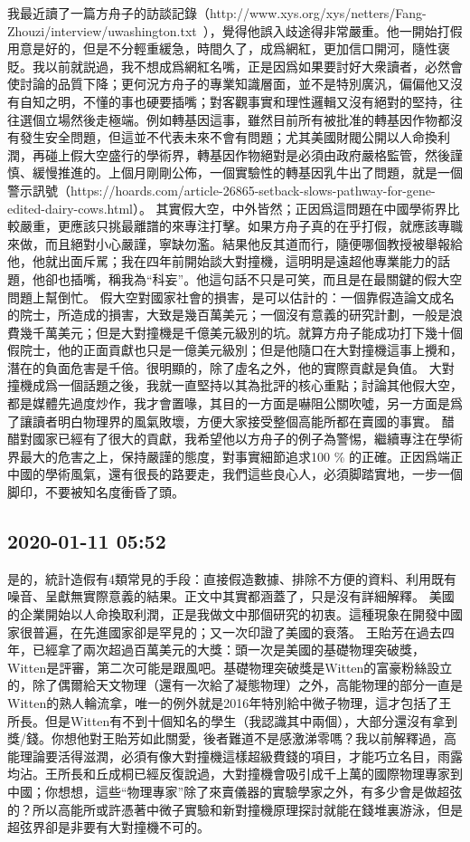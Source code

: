 \documentclass[twocolumn]{ctexart}
\begin{document}
我最近讀了一篇方舟子的訪談記錄（http://www.xys.org/xys/netters/Fang-Zhouzi/interview/uwashington.txt ），覺得他誤入歧途得非常嚴重。他一開始打假用意是好的，但是不分輕重緩急，時間久了，成爲網紅，更加信口開河，隨性褒貶。我以前就説過，我不想成爲網紅名嘴，正是因爲如果要討好大衆讀者，必然會使討論的品質下降；更何況方舟子的專業知識層面，並不是特別廣汎，偏偏他又沒有自知之明，不懂的事也硬要插嘴；對客觀事實和理性邏輯又沒有絕對的堅持，往往選個立場然後走極端。例如轉基因這事，雖然目前所有被批准的轉基因作物都沒有發生安全問題，但這並不代表未來不會有問題；尤其美國財閥公開以人命換利潤，再碰上假大空盛行的學術界，轉基因作物絕對是必須由政府嚴格監管，然後謹慎、緩慢推進的。上個月剛剛公佈，一個實驗性的轉基因乳牛出了問題，就是一個警示訊號（https://hoards.com/article-26865-setback-slows-pathway-for-gene-edited-dairy-cows.html）。
其實假大空，中外皆然；正因爲這問題在中國學術界比較嚴重，更應該只挑最離譜的來專注打擊。如果方舟子真的在乎打假，就應該專職來做，而且絕對小心嚴謹，寧缺勿濫。結果他反其道而行，隨便哪個教授被舉報給他，他就出面斥駡；我在四年前開始談大對撞機，這明明是遠超他專業能力的話題，他卻也插嘴，稱我為“科妄”。他這句話不只是可笑，而且是在最關鍵的假大空問題上幫倒忙。
假大空對國家社會的損害，是可以估計的：一個靠假造論文成名的院士，所造成的損害，大致是幾百萬美元；一個沒有意義的研究計劃，一般是浪費幾千萬美元；但是大對撞機是千億美元級別的坑。就算方舟子能成功打下幾十個假院士，他的正面貢獻也只是一億美元級別；但是他隨口在大對撞機這事上攪和，潛在的負面危害是千倍。很明顯的，除了虛名之外，他的實際貢獻是負值。
大對撞機成爲一個話題之後，我就一直堅持以其為批評的核心重點；討論其他假大空，都是媒體先過度炒作，我才會置喙，其目的一方面是嚇阻公關吹噓，另一方面是爲了讓讀者明白物理界的風氣敗壞，方便大家接受整個高能所都在賣國的事實。
醋醋對國家已經有了很大的貢獻，我希望他以方舟子的例子為警惕，繼續專注在學術界最大的危害之上，保持嚴謹的態度，對事實細節追求100 \% 的正確。正因爲端正中國的學術風氣，還有很長的路要走，我們這些良心人，必須脚踏實地，一步一個脚印，不要被知名度衝昏了頭。
\subsection*{2020-01-11 05:52}

是的，統計造假有4類常見的手段：直接假造數據、排除不方便的資料、利用既有噪音、呈獻無實際意義的結果。正文中其實都涵蓋了，只是沒有詳細解釋。 
美國的企業開始以人命換取利潤，正是我做文中那個研究的初衷。這種現象在開發中國家很普遍，在先進國家卻是罕見的；又一次印證了美國的衰落。 
王貽芳在過去四年，已經拿了兩次超過百萬美元的大獎：頭一次是美國的基礎物理突破獎，Witten是評審，第二次可能是跟風吧。基礎物理突破獎是Witten的富豪粉絲設立的，除了偶爾給天文物理（還有一次給了凝態物理）之外，高能物理的部分一直是Witten的熟人輪流拿，唯一的例外就是2016年特別給中微子物理，這才包括了王所長。但是Witten有不到十個知名的學生（我認識其中兩個），大部分還沒有拿到獎/錢。你想他對王貽芳如此關愛，後者難道不是感激涕零嗎？我以前解釋過，高能理論要活得滋潤，必須有像大對撞機這樣超級費錢的項目，才能巧立名目，雨露均沾。王所長和丘成桐已經反復說過，大對撞機會吸引成千上萬的國際物理專家到中國；你想想，這些“物理專家”除了來賣儀器的實驗學家之外，有多少會是做超弦的？所以高能所或許憑著中微子實驗和新對撞機原理探討就能在錢堆裏游泳，但是超弦界卻是非要有大對撞機不可的。
\end{document}
